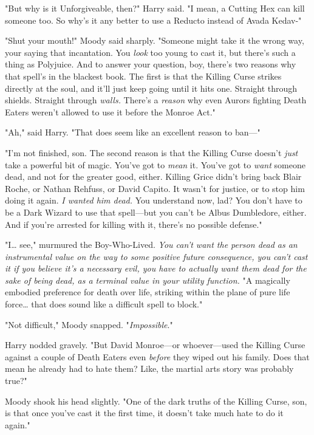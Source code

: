 "But why is it Unforgiveable, then?" Harry said. "I mean, a Cutting Hex can 
kill someone too. So why's it any better to use a Reducto instead of Avada 
Kedav-"

"Shut your mouth!" Moody said sharply. "Someone might take it the wrong way, 
your saying that incantation. You \emph{look} too young to cast it, but there's 
such a thing as Polyjuice. And to answer your question, boy, there's two 
reasons why that spell's in the blackest book. The first is that the Killing 
Curse strikes directly at the soul, and it'll just keep going until it hits 
one. Straight through shields. Straight through \emph{walls.} There's a 
\emph{reason} why even Aurors fighting Death Eaters weren't allowed to use it 
before the Monroe Act."

"Ah," said Harry. "That does seem like an excellent reason to ban---"

"I'm not finished, son. The second reason is that the Killing Curse doesn't 
\emph{just} take a powerful bit of magic. You've got to \emph{mean} it. You've 
got to \emph{want} someone dead, and not for the greater good, either. Killing 
Grice didn't bring back Blair Roche, or Nathan Rehfuss, or David Capito. It 
wasn't for justice, or to stop him doing it again. \emph{I wanted him dead.} 
You understand now, lad? You don't have to be a Dark Wizard to use that 
spell---but you can't be Albus Dumbledore, either. And if you're arrested for 
killing with it, there's no possible defense."

"I{\ldots} see," murmured the Boy-Who-Lived. \emph{You can't want the person 
dead as an instrumental value on the way to some positive future consequence, 
you can't cast it if you believe it's a necessary evil, you have to actually 
want them dead for the sake of being dead, as a terminal value in your utility 
function.} "A magically embodied preference for death over life, striking 
within the plane of pure life force{\ldots} that does sound like a difficult 
spell to block."

"Not difficult," Moody snapped. "\emph{Impossible}."

Harry nodded gravely. "But David Monroe---or whoever---used the Killing Curse 
against a couple of Death Eaters even \emph{before} they wiped out his family. 
Does that mean he already had to hate them? Like, the martial arts story was 
probably true?"

Moody shook his head slightly. "One of the dark truths of the Killing Curse, 
son, is that once you've cast it the first time, it doesn't take much hate to 
do it again."

